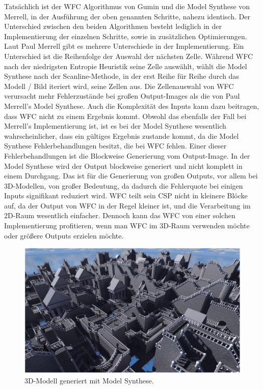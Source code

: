 \documentclass[12pt, a4paper,twoside,openright]{report} %
\begin{document}
Tatsächlich ist der WFC Algorithmus von Gumin und die Model Synthese von Merrell, in der Ausführung der oben genannten Schritte, nahezu identisch.
Der Unterschied zwischen den beiden Algorithmen besteht lediglich in der Implementierung der einzelnen Schritte, sowie in zusätzlichen Optimierungen.
Laut Paul Merrell gibt es mehrere Unterschiede in der Implementierung.
Ein Unterschied ist die Reihenfolge der Auswahl der nächsten Zelle.
Während WFC nach der niedrigsten Entropie Heuristik seine Zelle auswählt,
wählt die Model Synthese nach der Scanline-Methode, in der erst Reihe für Reihe durch das Modell / Bild iteriert wird, seine Zellen aus.
Die Zellenauswahl von WFC verursacht mehr Fehlerzustände bei großen Output-Images als die von Paul Merrell's Model Synthese.
Auch die Komplexität des Inputs kann dazu beitragen, dass WFC nicht zu einem Ergebnis kommt.
Obwohl das ebenfalls der Fall bei Merrell's Implementierung ist, ist es bei der Model Synthese wesentlich wahrscheinlicher, dass ein gültiges Ergebnis zustande kommt,
da die Model Synthese Fehlerbehandlungen besitzt, die bei WFC fehlen.
\newline
Einer dieser Fehlerbehandlungen ist die Blockweise Generierung vom Output-Image.
In der Model Synthese wird der Output blockweise generiert und nicht komplett in einem Durchgang.
Das ist für die Generierung von großen Outputs, vor allem bei 3D-Modellen, von großer Bedeutung, da dadurch die Fehlerquote bei einigen Inputs signifikant reduziert wird.
WFC teilt sein CSP nicht in kleinere Blöcke auf, da der Output von WFC in der Regel kleiner ist, und die Verarbeitung im 2D-Raum wesentlich einfacher.
Dennoch kann das WFC von einer solchen Implementierung profitieren, wenn man WFC im 3D-Raum verwenden möchte oder größere Outputs erzielen möchte. \cite{merrell2018compare}

\begin{figure}[H]
    \centering
    \includegraphics[width=1\linewidth]{images/3D-model-synthese.JPG}%
    \caption{3D-Modell generiert mit Model Synthese. \cite{merrell2018compare}}%
\end{figure}
\end{document}
